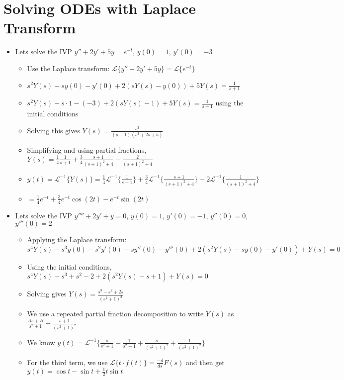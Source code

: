 \documentclass[12pt]{article}
\begin{document}
\section{Solving ODEs with Laplace Transform}
\begin{itemize}
    \item Lets solve the IVP $y'' + 2y' + 5y = e^{-t}$, $y(0) = 1$, $y'(0) = -3$ \begin{itemize}
        \item Use the Laplace transform: $\mathcal{L} \{y'' + 2y' + 5y\} = \mathcal{L} \{e^{-t} \}$
        \item $s^2 Y(s) - sy(0) - y'(0) + 2(sY(s) - y(0)) + 5Y(s) = \frac{1}{s+1}$
        \item $s^2 Y(s) - s \cdot 1 - (-3) + 2(sY(s) - 1) + 5 Y(s) = \frac{1}{s+1}$ using the initial conditions
        \item Solving this gives $Y(s) = \frac{s^2}{(s+1)(s^2+2s+5)}$
        \item Simplifying and using partial fractions, $Y(s) = \frac{1}{4} \frac{1}{s+1} + \frac{3}{4} \frac{s+1}{(s+1)^2 + 4} - \frac{2}{(s+1)^2 + 4}$
        \item $y(t) = \mathcal{L} ^{-1} \{Y(s) \} = \frac{1}{4} \mathcal{L} ^{-1} \{\frac{1}{s+1}\} + \frac{3}{4} \mathcal{L} ^{-1} \{\frac{s+1}{(s+1)^2+4}\} - 2 \mathcal{L}^{-1} \{ \frac{1}{(s+1)^2+4}\}$ 
        \item $ = \frac{1}{4} e^{-t} + \frac{3}{4} e^{-t} \cos (2t) - e^{-t} \sin (2t)$
    \end{itemize}
    \item Lets solve the IVP $y'''' + 2y' + y = 0$, $y(0) = 1$, $y'(0) = -1$, $y''(0) = 0$, $y'''(0) = 2$ \begin{itemize}
        \item Applying the Laplace transform: $s^4 Y(s) - s^3 y(0) - s^2 y'(0) - s y''(0) - y'''(0) + 2 (s^2 Y(s) - sy(0) - y'(0)) + Y(s) = 0$
        \item Using the initial conditions, $s^4 Y(s) - s^3 + s^2 - 2 + 2(s^2Y(s) - s + 1) + Y(s) = 0$
        \item Solving gives $Y(s) = \frac{s^3 - s^2 + 2s}{(s^2+1)^2}$
        \item We use a repeated partial fraction decomposition to write $Y(s)$ as $\frac{As+B}{s^2+1} + \frac{s+1}{(s^2+1)^2}$
        \item We know $y(t) = \mathcal{L} ^{-1} \{ \frac{s}{s^2+1} - \frac{1}{s^2+1} + \frac{s}{(s^2+1)^2} + \frac{1}{(s^2+1)^2} \}$
        \item For the third term, we use $\mathcal{L} \{t \cdot f(t) \} = \frac{-d}{ds} F(s)$ and then get $ y(t) = \cos t - \sin t + \frac{1}{2}t \sin t$
    \end{itemize}
\end{itemize}
\end{document}
